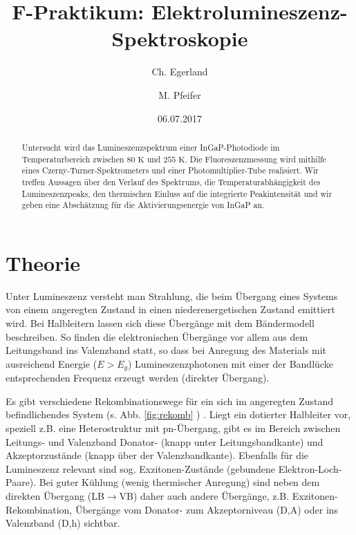 \documentclass[aps,twocolumn,secnumarabic,nobalancelastpage,amsmath,amssymb,
nofootinbib,superscriptaddress]{revtex4-1}
\begin{document}
\title{F-Praktikum: Elektrolumineszenz-Spektroskopie}
\author         {Ch. Egerland}
\author         {M. Pfeifer}
\date[Versuchsdatum: ]{06.07.2017}

\begin{abstract}
Untersucht wird das Lumineszenzspektrum einer InGaP-Photodiode im Temperaturbereich zwischen
$80\text{ K}$ und $255\text{ K}$. Die Fluoreszenzmessung wird mithilfe eines Czerny-Turner-Spektrometers
und einer Photomultiplier-Tube realisiert. Wir treffen Aussagen über den Verlauf des Spektrums, die
Temperaturabhängigkeit des Lumineszenzpeaks, den thermischen Einluss auf die integrierte Peakintensität und
wir geben eine Abschätzung für die Aktivierungsenergie von InGaP an.
\end{abstract}


\maketitle



\section{Theorie}

\noindent Unter Lumineszenz versteht man Strahlung, die beim Übergang eines Systems von einem angeregten Zustand
in einen niederenergetischen Zustand emittiert wird. Bei Halbleitern lassen sich diese Übergänge mit dem Bändermodell
beschreiben. So finden die elektronischen Übergänge vor allem aus dem Leitungsband ins Valenzband statt, so dass bei
Anregung des Materials mit ausreichend Energie ($E>E_g$) Lumineszenzphotonen mit einer der Bandlücke entsprechenden
Frequenz erzeugt werden (direkter Übergang).\newline

\noindent Es gibt verschiedene Rekombinationswege für ein sich im angeregten Zustand befindlichendes System (s. Abb. \ref{fig:rekomb} ) \cite{saarland}.
Liegt ein dotierter Halbleiter vor, speziell z.B. eine Heterostruktur mit pn-Übergang, gibt es im Bereich zwischen Leitungs-
und Valenzband Donator- (knapp unter Leitungsbandkante) und Akzeptorzustände (knapp über der Valenzbandkante). Ebenfalls für die
Lumineszenz relevant sind sog. Exzitonen-Zustände (gebundene Elektron-Loch-Paare). Bei guter Kühlung (wenig thermischer
Anregung) sind neben dem direkten Übergang (LB$\rightarrow$VB) daher auch andere Übergänge, z.B. Exzitonen-Rekombination,
Übergänge vom Donator- zum Akzeptorniveau (D,A) oder ins Valenzband (D,h) sichtbar.
\end{document}
